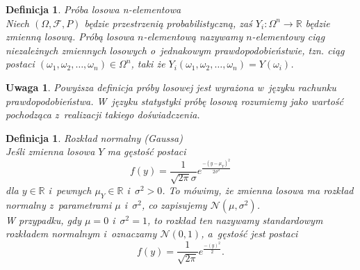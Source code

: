 \documentclass[12pt,a4paper]{report}
\newtheorem{definition}[theorem]{Definicja}
\newtheorem{uwaga}{Uwaga}
\begin{document}
\begin{definition}{Próba losowa n-elementowa \cite[Rozdział 2]{bartoszewicz1996}}\\
Niech $(\Omega, \mathcal{F}, P)$ będzie przestrzenią probabilistyczną, zaś $Y_{i}:\Omega^{n}  \rightarrow \mathbb{R}$ będzie zmienną losową.  
Próbą losowa $n$-elementową nazywamy $n$-elementowy ciąg niezależnych zmiennych losowych o~jednakowym prawdopodobieństwie, tzn. ciąg postaci $(\omega_{1}, \omega_{2}, \ldots, \omega_{n}) \in \Omega^{n}$, taki że $Y_{i}(\omega_{1}, \omega_{2}, \ldots, \omega_{n})=Y(\omega_{i})$.
\end{definition}


\begin{uwaga}
Powyższa definicja próby losowej jest wyrażona w~języku rachunku prawdopodobieństwa. W~języku statystyki próbę losową rozumiemy jako wartość pochodząca z~realizacji takiego doświadczenia.
\end{uwaga}



\begin{definition}{Rozkład normalny (Gaussa) \cite[Rozdział 5.10]{jakubowski2004}}\\
Jeśli zmienna losowa $Y$ ma gęstość postaci
$$
f(y)=\frac{1}{\sqrt{2\pi}\sigma}e^\frac{-(y-\mu_Y)^2}{2\sigma^2}
$$ 
dla $y \in \mathbb{R}$ i~pewnych $\mu_Y \in \mathbb{R}$ i~$\sigma^2 >0$. To mówimy, że zmienna losowa ma rozkład normalny z~parametrami $\mu$ i~$\sigma^2$, co zapisujemy $\mathcal{N}(\mu, \sigma^2)$.\\
W przypadku, gdy $\mu=0$ i~$\sigma^2=1$, to rozkład ten nazywamy standardowym rozkładem normalnym i~oznaczamy $\mathcal{N}(0,1)$, a~gęstość jest postaci
$$f(y)=\frac{1}{\sqrt{2\pi}}e^\frac{-(y)^2}{2}.$$ 
\end{definition}


\end{document}
